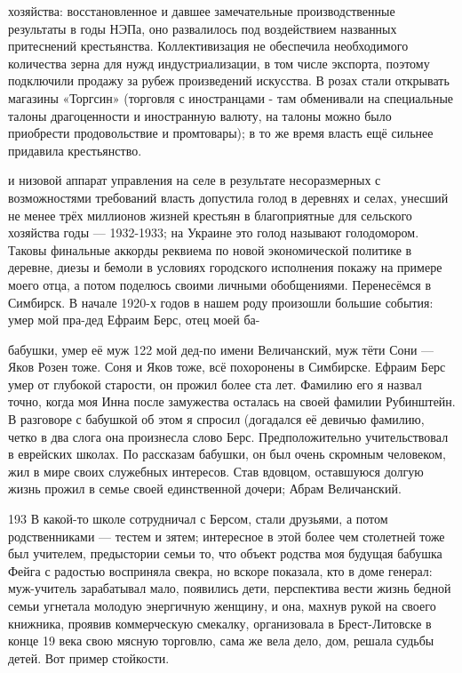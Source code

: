 хозяйства: восстановленное и давшее замечательные производственные результаты в годы НЭПа, оно развалилось под воздействием названных притеснений крестьянства. Коллективизация не обеспечила необходимого количества зерна для нужд индустриализации, в том числе экспорта, поэтому подключили продажу за рубеж произведений искусства. В розах стали открывать магазины «Торгсин» (торговля с иностранцами - там обменивали на специальные талоны драгоценности и иностранную валюту, на талоны можно было приобрести продовольствие и промтовары); в то же время власть ещё сильнее придавила крестьянство.

и низовой аппарат управления на селе в результате несоразмерных с возможностями требований власть допустила голод в деревнях и селах, унесший не менее трёх миллионов жизней крестьян в благоприятные для сельского хозяйства годы — 1932-1933; на Украине это голод называют голодомором. Таковы финальные аккорды реквиема по новой экономической политике в деревне, диезы и бемоли в условиях городского исполнения покажу на примере моего отца, а потом поделюсь своими личными обобщениями. Перенесёмся в Симбирск. В начале 1920-х годов в нашем роду произошли большие события: умер мой пра-дед Ефраим Берс, отец моей ба-

бабушки, умер её муж 122 мой дед-по имени Величанский, муж тёти Сони — Яков Розен тоже. Соня и Яков тоже, всё похоронены в Симбирске. Ефраим Берс умер от глубокой старости, он прожил более ста лет. Фамилию его я назвал точно, когда моя Инна после замужества осталась на своей фамилии Рубинштейн. В разговоре с бабушкой об этом я спросил (догадался её девичью фамилию, четко в два слога она произнесла слово Берс. Предположительно учительствовал в еврейских школах. По рассказам бабушки, он был очень скромным человеком, жил в мире своих служебных интересов. Став вдовцом, оставшуюся долгую жизнь прожил в семье своей единственной дочери; Абрам Величанский.

193 В какой-то школе сотрудничал с Берсом, стали друзьями, а потом родственниками — тестем и зятем; интересное в этой более чем столетней тоже был учителем, предыстории семьи то, что объект родства моя будущая бабушка Фейга с радостью восприняла свекра, но вскоре показала, кто в доме генерал: муж-учитель зарабатывал мало, появились дети, перспектива вести жизнь бедной семьи угнетала молодую энергичную женщину, и она, махнув рукой на своего книжника, проявив коммерческую смекалку, организовала в Брест-Литовске в конце 19 века свою мясную торговлю, сама же вела дело, дом, решала судьбы детей. Вот пример стойкости.

